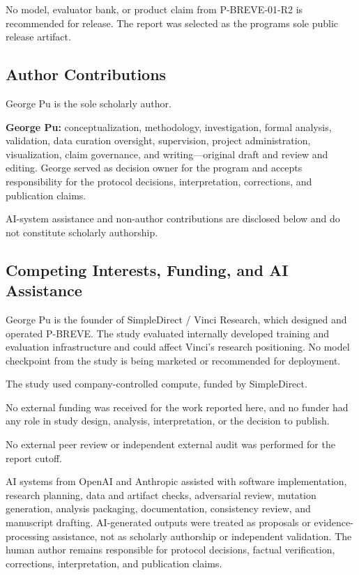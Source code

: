 \documentclass[
]{article}
\begin{document}
No model, evaluator bank, or product claim from P-BREVE-01-R2 is
recommended for release. The report was selected as the
program\textquotesingle s sole public release artifact.

\subsection{Author Contributions}\label{author-contributions}

George Pu is the sole scholarly author.

\textbf{George Pu:} conceptualization, methodology, investigation,
formal analysis, validation, data curation oversight, supervision,
project administration, visualization, claim governance, and
writing---original draft and review and editing. George served as
decision owner for the program and accepts responsibility for the
protocol decisions, interpretation, corrections, and publication claims.

AI-system assistance and non-author contributions are disclosed below
and do not constitute scholarly authorship.

\subsection{Competing Interests, Funding, and AI
Assistance}\label{competing-interests-funding-and-ai-assistance}

George Pu is the founder of SimpleDirect / Vinci Research, which
designed and operated P-BREVE. The study evaluated internally developed
training and evaluation infrastructure and could affect Vinci's research
positioning. No model checkpoint from the study is being marketed or
recommended for deployment.

The study used company-controlled compute, funded by SimpleDirect.

No external funding was received for the work reported here, and no
funder had any role in study design, analysis, interpretation, or the
decision to publish.

No external peer review or independent external audit was performed for
the report cutoff.

AI systems from OpenAI and Anthropic assisted with software
implementation, research planning, data and artifact checks, adversarial
review, mutation generation, analysis packaging, documentation,
consistency review, and manuscript drafting. AI-generated outputs were
treated as proposals or evidence-processing assistance, not as scholarly
authorship or independent validation. The human author remains
responsible for protocol decisions, factual verification, corrections,
interpretation, and publication claims.
\end{document}
